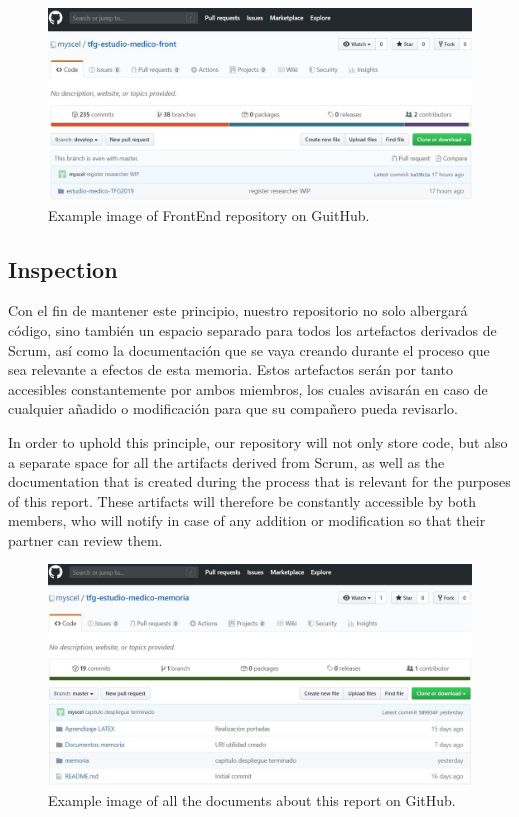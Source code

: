 \begin{itemize}
    \begin{figure}[h]
    \centering
     \includegraphics[width=1\textwidth]{images/GitHubFront.jpg}
    \caption{Example image of FrontEnd repository on GuitHub.}
    \end{figure}
    \end{itemize}
    
    \subsection{Inspection}
    Con el fin de mantener este principio, nuestro repositorio no solo albergará código, sino también un espacio separado para todos los artefactos derivados de Scrum, así como la documentación que se vaya creando durante el proceso que sea relevante a efectos de esta memoria. Estos artefactos serán por tanto accesibles constantemente por ambos miembros, los cuales avisarán en caso de cualquier añadido o modificación para que su compañero pueda revisarlo.\newpage
    
    In order to uphold this principle, our repository will not only store code, but also a separate space for all the artifacts derived from Scrum, as well as the documentation that is created during the process that is relevant for the purposes of this report. These artifacts will therefore be constantly accessible by both members, who will notify in case of any addition or modification so that their partner can review them.\newline
    
    \begin{figure}[h]
    \centering
     \includegraphics[width=1\textwidth]{images/GitHubMemoria.jpg}
    \caption{Example image of all the documents about this report on GitHub.}
    \end{figure}
    \newpage
    
